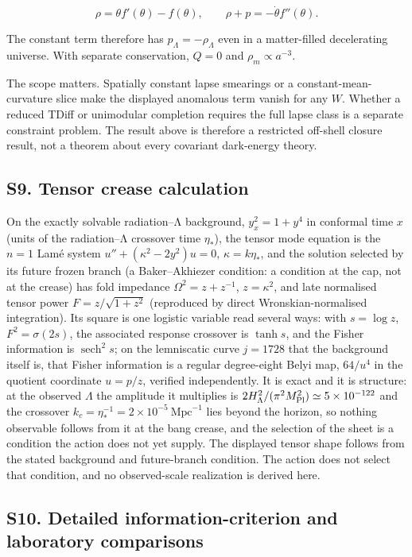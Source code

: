 \documentclass[
]{article}
\begin{document}
\[
\rho=\theta f'(\theta)-f(\theta),\qquad
\rho+p=-\dot\theta f''(\theta).
\]

The constant term therefore has \(p_\Lambda=-\rho_\Lambda\) even in a
matter-filled decelerating universe. With separate conservation, \(Q=0\)
and \(\rho_m\propto a^{-3}\).

The scope matters. Spatially constant lapse smearings or a
constant-mean- curvature slice make the displayed anomalous term vanish
for any \(W\). Whether a reduced TDiff or unimodular completion requires
the full lapse class is a separate constraint problem. The result above
is therefore a restricted off-shell closure result, not a theorem about
every covariant dark-energy theory.

\subsection{S9. Tensor crease
calculation}\label{s9.-tensor-crease-calculation}

On the exactly solvable radiation--Λ background, \(y_x^2=1+y^4\) in
conformal time \(x\) (units of the radiation--Λ crossover time
\(\eta_*\)), the tensor mode equation is the \(n=1\) Lamé system
\(u''+(\kappa^2-2y^2)u=0\), \(\kappa=k\eta_*\), and the solution
selected by its future frozen branch (a Baker--Akhiezer condition: a
condition at the cap, not at the crease) has fold impedance
\(\Omega^2=z+z^{-1}\), \(z=\kappa^2\), and late normalised tensor power
\(F=z/\sqrt{1+z^2}\) (reproduced by direct Wronskian-normalised
integration). Its square is one logistic variable read several ways:
with \(s=\log z\), \(F^2=\sigma(2s)\), the associated response crossover
is \(\tanh s\), and the Fisher information is
\(\operatorname{sech}^2s\); on the lemniscatic curve \(j=1728\) that the
background itself is, that Fisher information is a regular degree-eight
Belyi map, \(64/u^4\) in the quotient coordinate \(u=p/z\), verified
independently. It is exact and it is structure: at the observed
\(\Lambda\) the amplitude it multiplies is
\(2H_\Lambda^2/(\pi^2M_{\rm Pl}^2)\simeq5\times10^{-122}\) and the
crossover \(k_c=\eta_*^{-1}=2\times10^{-5}\ \mathrm{Mpc}^{-1}\) lies
beyond the horizon, so nothing observable follows from it at the bang
crease, and the selection of the sheet is a condition the action does
not yet supply. The displayed tensor shape follows from the stated
background and future-branch condition. The action does not select that
condition, and no observed-scale realization is derived here.

\subsection{S10. Detailed information-criterion and laboratory
comparisons}\label{s10.-detailed-information-criterion-and-laboratory-comparisons}
\end{document}
